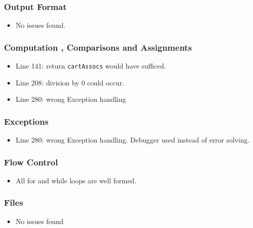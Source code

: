 \subsubsection{Output Format}
\begin{itemize}
\item No issues found.
\end{itemize}
\subsubsection{Computation , Comparisons and Assignments}
\begin{itemize}
\item Line 141: return \texttt{cartAssocs} would have sufficed.
\item Line 208: division by 0 could occur.
\item Line 280: wrong Exception handling
\end{itemize}
\subsubsection{Exceptions}
\begin{itemize}
\item Line 280: wrong Exception handling. Debugger used instead of error solving.
\end{itemize}
\subsubsection{Flow Control}
\begin{itemize}
\item All for and while loops are well formed.
\end{itemize}
\subsubsection{Files}
\begin{itemize}
\item No issues found
\end{itemize}
